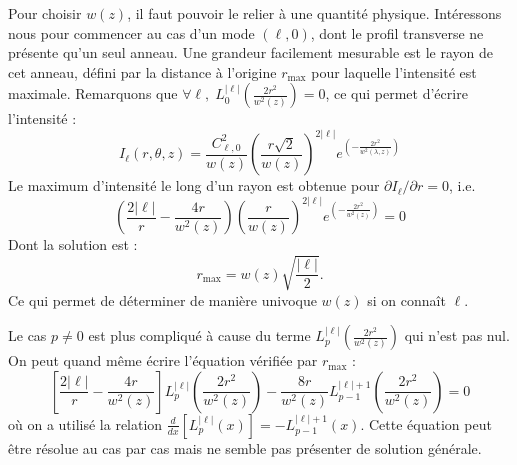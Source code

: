 Pour choisir $w(z)$, il faut pouvoir le relier à une quantité physique. Intéressons nous pour commencer au cas d'un mode $(\ell,0)$, dont le profil transverse ne présente qu'un seul anneau. Une grandeur facilement mesurable est le rayon de cet anneau, défini par la distance à l'origine $r_\mathrm{max}$ pour laquelle l'intensité est maximale. Remarquons que $\forall\ell, \;L_0^{\left| \ell  \right|}\left(\frac{2r^2}{w^2(z)}\right) = 0$, ce qui permet d'écrire l'intensité :
\begin{equation*}
{I_\ell }(r,\theta ,z) = \frac{C_{\ell,0}^2}{{{w}\left( {z} \right)}}{\left( {\frac{r\sqrt{2}}{{w\left( z \right)}}} \right)^{2\left| \ell  \right|}}{e^{\left( { - \frac{{2{r^2}}}{{{w^2}\left( {\lambda ,z} \right)}}} \right)}}
\end{equation*}
Le maximum d'intensité le long d'un rayon est obtenue pour $\partial {I_\ell }/\partial r = 0$, i.e. 
\begin{equation*}
	\left( {\frac{{2\left| \ell  \right|}}{r} - \frac{{4r}}{{{w^2}\left( z \right)}}} \right){\left( {\frac{r}{{w\left( z \right)}}} \right)^{2\left| \ell  \right|}}{e^{\left( { - \frac{{2{r^2}}}{{{w^2}\left( z \right)}}} \right)}} = 0
\end{equation*}
Dont la solution est :
\begin{equation}
{r_{{\mathrm{max}}}} = w\left( {z} \right)\sqrt {\frac{{\left| \ell  \right|}}{2}}.
\label{Eq:rmax_LG}
\end{equation}
Ce qui permet de déterminer de manière univoque $w(z)$ si on connaît $\ell$.

Le cas $p\neq 0$ est plus compliqué à cause du terme $L_p^{\left| \ell  \right|}\left(\frac{2r^2}{w^2(z)}\right)$ qui n'est pas nul. On peut quand même écrire l'équation vérifiée par $r_\mathrm{max}$ :
\begin{equation*}
 \left[{\frac{{2\left| \ell  \right|}}{r} - \frac{{4r}}{{{w^2}\left( z \right)}}}\right]L_p^{\left| \ell  \right|}\left(\frac{2r^2}{w^2(z)}\right)
	- \frac{8r}{w^2(z)} L_{p-1}^{\left| \ell \right|+1}\left(\frac{2r^2}{w^2(z)}\right)
	= 0
\end{equation*}
où on a utilisé la relation $\frac{d}{dx}\left[L_{p}^{\left| \ell \right|}(x)\right] = -L_{p-1}^{\left| \ell \right|+1}(x)$. Cette équation peut être résolue au cas par cas mais ne semble pas présenter de solution générale.

